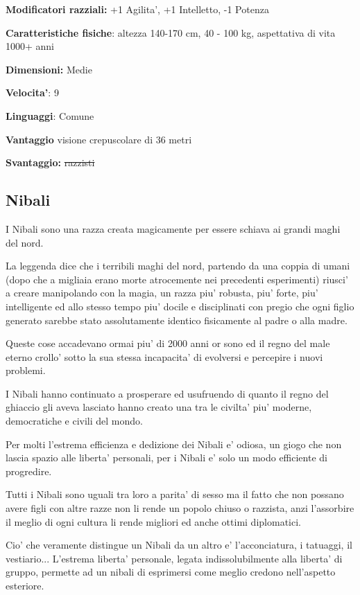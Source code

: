 \documentclass[a4paper,11pt,twoside,openany]{book}
\begin{document}
\textbf{Modificatori razziali:} +1 Agilita', +1 Intelletto, -1 Potenza

\textbf{Caratteristiche fisiche}: altezza 140-170 cm, 40 - 100 kg,
aspettativa di vita 1000+ anni

\textbf{Dimensioni:} Medie

\textbf{Velocita'}: 9

\textbf{Linguaggi}: Comune

\textbf{Vantaggio} visione crepuscolare di 36 metri

\textbf{Svantaggio:} \sout{razzisti}

\subsection{Nibali}

\label{nibali}

I Nibali sono una razza creata magicamente per essere schiava ai grandi maghi del nord.

La leggenda dice che i terribili maghi del nord, partendo da una coppia di umani (dopo che a migliaia erano morte atrocemente nei precedenti esperimenti) riusci' a creare manipolando con la magia, un razza piu' robusta, piu' forte, piu' intelligente ed allo stesso tempo piu' docile e disciplinati con pregio che ogni figlio generato sarebbe stato assolutamente identico fisicamente al padre o alla madre.

Queste cose accadevano ormai piu' di 2000 anni or sono ed il regno del male eterno crollo' sotto la sua stessa incapacita' di evolversi e percepire i nuovi problemi.

I Nibali hanno continuato a prosperare ed usufruendo di quanto il regno del ghiaccio gli aveva lasciato hanno creato una tra le civilta' piu' moderne, democratiche e civili del mondo.

Per molti l'estrema efficienza e dedizione dei Nibali e' odiosa, un giogo che non lascia spazio alle liberta' personali, per i Nibali e' solo un modo efficiente di progredire.

Tutti i Nibali sono uguali tra loro a parita' di sesso ma il fatto che non possano avere figli con altre razze non li rende un popolo chiuso o razzista, anzi l'assorbire il meglio di ogni cultura li rende migliori ed anche ottimi diplomatici. 

Cio' che veramente distingue un Nibali da un altro e' l'acconciatura, i tatuaggi, il vestiario... L'estrema liberta' personale, legata indissolubilmente alla liberta' di gruppo, permette ad un nibali di esprimersi come meglio credono nell'aspetto esteriore.
\end{document}
